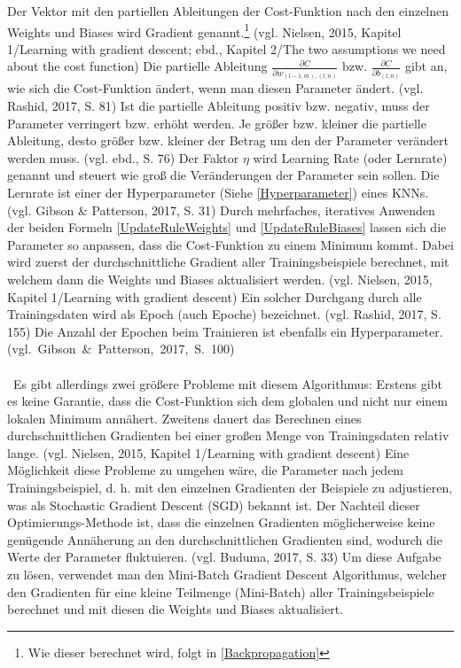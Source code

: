 \documentclass[a4paper,12pt,ngerman,oneside]{scrreprt}	%
\newcommand{\practitioner}[1]{(vgl. Gibson \& Patterson, 2017, S. {#1})}
\newcommand{\fundamentals}[1]{(vgl. Buduma, 2017, S. {#1})}
\begin{document}
			Der Vektor mit den partiellen Ableitungen der Cost-Funktion nach den einzelnen Weights und Biases wird Gradient genannt.\footnote{Wie dieser berechnet wird, folgt in \ref{Backpropagation}} (vgl. Nielsen, 2015, Kapitel 1/Learning with gradient descent; ebd., Kapitel 2/The two assumptions we need about the cost function) Die partielle Ableitung $\frac{\partial C}{\partial w_{(l-1,m),(l,n)}}$ bzw. $\frac{\partial C}{\partial b_{(l,n)}}$ gibt an, wie sich die Cost-Funktion ändert, wenn man diesen Parameter ändert. (vgl. Rashid, 2017, S. 81) Ist die partielle Ableitung positiv bzw. negativ, muss der Parameter verringert bzw. erhöht werden. Je größer bzw. kleiner die partielle Ableitung, desto größer bzw. kleiner der Betrag um den der Parameter verändert werden muss. (vgl. ebd., S. 76) Der Faktor $\eta$ wird Learning Rate (oder Lernrate) genannt und steuert wie groß die Veränderungen der Parameter sein sollen. Die Lernrate ist einer der Hyperparameter (Siehe \ref{Hyperparameter}) eines KNNs. \practitioner{31} \newline \break
			Durch mehrfaches, iteratives Anwenden der beiden Formeln \ref{UpdateRuleWeights} und \ref{UpdateRuleBiases} lassen sich die Parameter so anpassen, dass die Cost-Funktion zu einem Minimum kommt. Dabei wird zuerst der durchschnittliche Gradient aller Trainingsbeispiele berechnet, mit welchem dann die Weights und Biases aktualisiert werden. (vgl. Nielsen, 2015, Kapitel 1/Learning with gradient descent) Ein solcher Durchgang durch alle Trainingsdaten wird als Epoch (auch Epoche) bezeichnet. (vgl. Rashid, 2017, S. 155) Die Anzahl der Epochen beim Trainieren ist ebenfalls ein Hyperparameter. \mbox{\practitioner{100}}
			\\\
			\\\
			Es gibt allerdings zwei größere Probleme mit diesem Algorithmus: Erstens gibt es keine Garantie, dass die Cost-Funktion sich dem globalen und nicht nur einem lokalen Minimum annähert. Zweitens dauert das Berechnen eines durchschnittlichen Gradienten bei einer großen Menge von Trainingsdaten relativ lange. (vgl. Nielsen, 2015, Kapitel 1/Learning with gradient descent) Eine Möglichkeit diese Probleme zu umgehen wäre, die Parameter nach jedem Trainingsbeispiel, d. h. mit den einzelnen Gradienten der Beispiele zu adjustieren, was als Stochastic Gradient Descent (SGD) bekannt ist. Der Nachteil dieser Optimierungs-Methode ist, dass die einzelnen Gradienten möglicherweise keine genügende Annäherung an den durchschnittlichen Gradienten sind, wodurch die Werte der Parameter fluktuieren. \fundamentals{33} Um diese Aufgabe zu lösen, verwendet man den Mini-Batch Gradient Descent Algorithmus, welcher den Gradienten für eine kleine Teilmenge (Mini-Batch) aller Trainingsbeispiele berechnet und mit diesen die Weights und Biases aktualisiert.%
\end{document}
